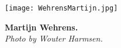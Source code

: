 

\begin{figure}
    \hfill
    \begin{minipage}[c]{0.25\textwidth}
        \texttt{[image: WehrensMartijn.jpg]}
        \caption*{\textbf{Martijn Wehrens.\\} {\tiny \textit{Photo by Wouter Harmsen.}}}
    \end{minipage}
\end{figure}

%
%
%
%
%
%
%
%
%
%

%
%
%
%    


